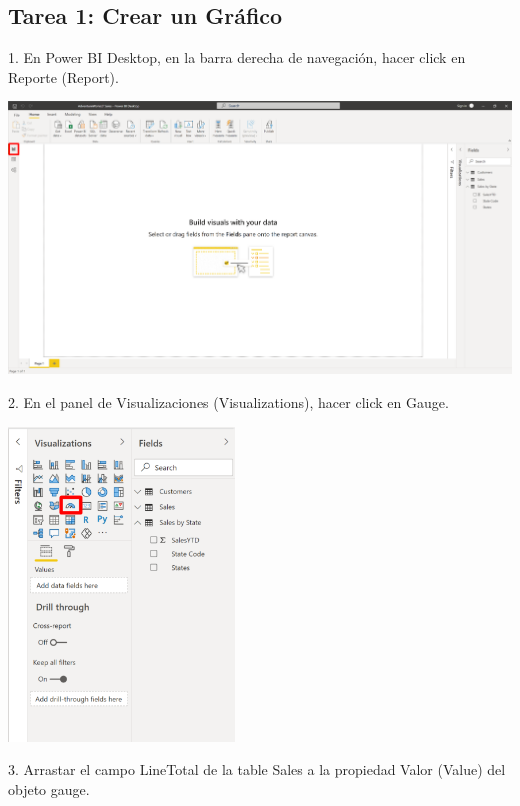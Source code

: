 \documentclass[12pt,letterpaper]{article}
\begin{document}
\subsection*{Tarea 1: Crear un Gráfico}
1. En Power BI Desktop, en la barra derecha de navegación, hacer click en Reporte (Report).
\begin{center}
    \includegraphics[width=17cm]{img/71.png}
\end{center}
2. En el panel de Visualizaciones (Visualizations), hacer click en Gauge.
\begin{center}
    \includegraphics[width=6cm]{img/72.png}
\end{center}
3. Arrastar el campo LineTotal de la table Sales a la propiedad Valor (Value) del objeto gauge.
\end{document}
